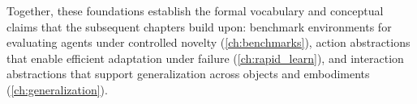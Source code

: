 Together, these foundations establish the formal vocabulary and conceptual claims that the subsequent chapters build upon: benchmark environments for evaluating agents under controlled novelty (\cref{ch:benchmarks}), action abstractions that enable efficient adaptation under failure (\cref{ch:rapid_learn}), and interaction abstractions that support generalization across objects and embodiments (\cref{ch:generalization}).










